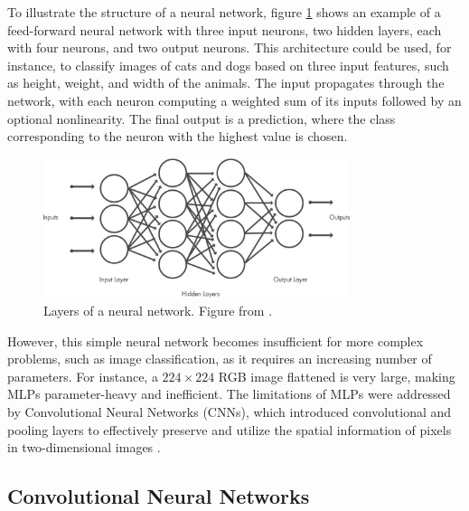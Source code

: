 To illustrate the structure of a neural network, figure \ref{fig:dnn_layers} shows an example of a feed-forward neural network with three input neurons, two hidden layers, each with four neurons, and two output neurons. This architecture could be used, for instance, to classify images of cats and dogs based on three input features, such as height, weight, and width of the animals. The input propagates through the network, with each neuron computing a weighted sum of its inputs followed by an optional nonlinearity. The final output is a prediction, where the class corresponding to the neuron with the highest value is chosen.

\begin{figure}[ht]
    \centering
    \includegraphics[width=0.8\textwidth]{Images/cnn_layers.jpg} 
    \caption{Layers of a neural network. Figure from \cite{mathworks_cnn}. }
    \label{fig:dnn_layers}
\end{figure}

However, this simple neural network becomes insufficient for more complex problems, such as image classification, as it requires an increasing number of parameters. For instance, a $224\times 224$ RGB image flattened is very large, making MLPs parameter-heavy and inefficient. The limitations of MLPs were addressed by Convolutional Neural Networks (CNNs), which introduced convolutional and pooling layers to effectively preserve and utilize the spatial information of pixels in two-dimensional images \cite{zhang2023dive}.


\subsection{Convolutional Neural Networks}
\label{sec:CNNs}


